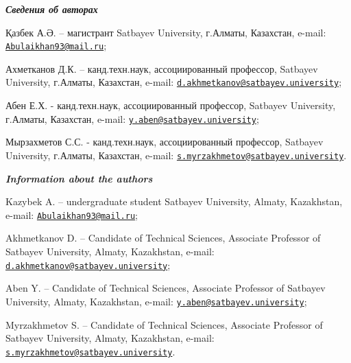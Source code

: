 \begin{authorinfo}

\hspace{1em}\emph{{\bfseries Сведения об авторах}}

Қазбек А.Ә. -- магистрант Satbayev University, г.Алматы, Казахстан,
e-mail:
\href{mailto:Abulaikhan93@mail.ru}{\nolinkurl{Abulaikhan93@mail.ru}};

Ахметканов Д.К. -- канд.техн.наук, ассоциированный профессор, Satbayev
University, г.Алматы, Казахстан, \linebreak e-mail:
\href{mailto:d.akhmetkanov@satbayev.university}{\nolinkurl{d.akhmetkanov@satbayev.university}};

Абен Е.Х. - канд.техн.наук, ассоциированный профессор, Satbayev
University, г.Алматы, Казахстан, \linebreak e-mail:
\href{mailto:y.aben@satbayev.university}{\nolinkurl{y.aben@satbayev.university}};

Мырзахметов С.С. - канд.техн.наук, ассоциированный профессор, Satbayev
University, г.Алматы, Казахстан, \linebreak e-mail:
\href{mailto:s.myrzakhmetov@satbayev.university}{\nolinkurl{s.myrzakhmetov@satbayev.university}}.

\hspace{1em}\emph{{\bfseries Information about the authors}}

Kazybek A. -- undergraduate student Satbayev University, Almaty,
Kazakhstan, e-mail:
\href{mailto:Abulaikhan93@mail.ru}{\nolinkurl{Abulaikhan93@mail.ru}};

Akhmetkanov D. -- Candidate of Technical Sciences, Associate Professor
of Satbayev University, Almaty, Kazakhstan, e-mail:
\href{mailto:d.akhmetkanov@satbayev.university}{\nolinkurl{d.akhmetkanov@satbayev.university}};

Aben Y. -- Candidate of Technical Sciences, Associate Professor of
Satbayev University, Almaty, Kazakhstan, e-mail:
\linebreak \href{mailto:y.aben@satbayev.university}{\nolinkurl{y.aben@satbayev.university}};

Myrzakhmetov S. -- Candidate of Technical Sciences, Associate Professor
of Satbayev University, Almaty, Kazakhstan, e-mail:
\href{mailto:s.myrzakhmetov@satbayev.university}{\nolinkurl{s.myrzakhmetov@satbayev.university}}.
\end{authorinfo}

